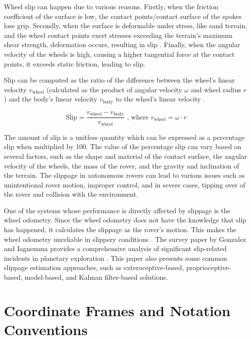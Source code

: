 \documentclass[report.tex]{subfiles}
\begin{document}
    Wheel slip can happen due to various reasons. Firstly, when the friction coefficient of the surface is low, the contact points/contact surface of the spokes lose grip. Secondly, when the surface is deformable under stress, like sand terrain, and the wheel contact points exert stresses exceeding the terrain's maximum shear strength, deformation occurs, resulting in slip \cite{Ojeda2006}. Finally, when the angular velocity of the wheels is high, causing a higher tangential force at the contact points, it exceeds static friction, leading to slip. 

    Slip can be computed as the ratio of the difference between the wheel’s linear velocity $v_\text{wheel}$ (calculated as the product of angular velocity $\omega$ and wheel radius $r$) and the body’s linear velocity $v_\text{body}$ to the wheel’s linear velocity \cite{Xiaobo2024}.

    $$
    \text{Slip} = \frac{v_{\text{wheel}} - v_{\text{body}}}{v_{\text{wheel}}} \text{ , }  
    \text{where } v_{\text{wheel}} = \omega \cdot r
    $$

    The amount of slip is a unitless quantity which can be expressed as a percentage slip when multiplied by 100. The value of the percentage slip can vary based on several factors, such as the shape and material of the contact surface, the angular velocity of the wheels, the mass of the rover, and the gravity and inclination of the terrain. The slippage in autonomous rovers can lead to various issues such as unintentional rover motion, improper control, and in severe cases, tipping over of the rover and collision with the environment.

    One of the systems whose performance is directly affected by slippage is the wheel odometry. Since the wheel odometry does not have the knowledge that slip has happened, it calculates the slippage as the rover's motion. This makes the wheel odometry unreliable in slippery conditions \cite{Brossard2019}. The survey paper by Gonzalez and Iagnemma provides a comprehensive analysis of significant slip-related incidents in planetary exploration \cite{Gonzalez2018}. This paper also presents some common slippage estimation approaches, such as exteroceptive-based, proprioceptive-based, model-based, and Kalman filter-based solutions. 

\section{Coordinate Frames and Notation Conventions}
\label{sec:background_frames_notation}
\end{document}
